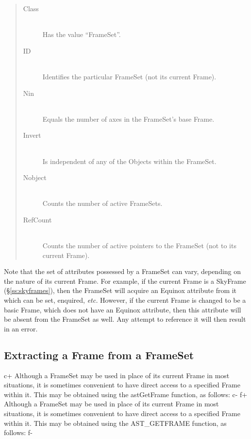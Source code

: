 \documentclass[twoside,11pt]{starlink}
\providecommand{\secref}[1]{\S\ref{#1}}
\begin{document}
{\begin{quote}
\begin{description}
\item[Class]\mbox{}\\
Has the value ``FrameSet''.

\item[ID]\mbox{}\\
Identifies the particular FrameSet (not its current Frame).

\item[Nin]\mbox{}\\
Equals the number of axes in the FrameSet's base Frame.

\item[Invert]\mbox{}\\
Is independent of any of the Objects within the FrameSet.

\item[Nobject]\mbox{}\\
Counts the number of active FrameSets.

\item[RefCount]\mbox{}\\
Counts the number of active pointers to the FrameSet (not to its
current Frame).
\end{description}
\end{quote}

Note that the set of attributes possessed by a FrameSet can vary,
depending on the nature of its current Frame. For example, if the
current Frame is a SkyFrame (\secref{ss:skyframes}), then the FrameSet
will acquire an Equinox attribute from it which can be set, enquired,
\emph{etc.}  However, if the current Frame is changed to be a basic
Frame, which does not have an Equinox attribute, then this attribute
will be absent from the FrameSet as well. Any attempt to reference it
will then result in an error.

\subsection{Extracting a Frame from a FrameSet}

c+
Although a FrameSet may be used in place of its current Frame in most
situations, it is sometimes convenient to have direct access to a
specified Frame within it. This may be obtained using the astGetFrame
function, as follows:
c-
f+
Although a FrameSet may be used in place of its current Frame in most
situations, it is sometimes convenient to have direct access to a
specified Frame within it. This may be obtained using the
AST\_GETFRAME function, as follows:
f-

}
\end{document}
